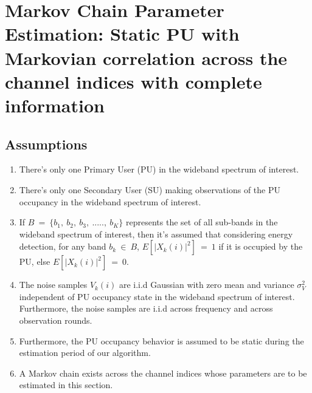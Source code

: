 \documentclass[12pt, draftcls, onecolumn]{IEEEtran}
\begin{document}
\section{Markov Chain Parameter Estimation: Static PU with Markovian correlation across the channel indices with complete information}
\subsection{Assumptions}
\begin{enumerate}
    \item There's only one Primary User (PU) in the wideband spectrum of interest.
    \item There's only one Secondary User (SU) making observations of the PU occupancy in the wideband spectrum of interest.
    \item If $B\ =\ \{b_1,\ b_2,\ b_3,\ .....,\ b_K\}$ represents the set of all sub-bands in the wideband spectrum of interest, then it's assumed that considering energy detection, for any band $b_k\ \in\ B$, $E[|X_k(i)|^2]\ =\ 1$ if it is occupied by the PU, else $E[|X_k(i)|^2]\ =\ 0$.
    \item The noise samples $V_k(i)$ are i.i.d Gaussian with zero mean and variance $\sigma_V^2$ independent of PU occupancy state in the wideband spectrum of interest. Furthermore, the noise samples are i.i.d across frequency and across observation rounds.
    \item Furthermore, the PU occupancy behavior is assumed to be static during the estimation period of our algorithm.
    \item A Markov chain exists across the channel indices whose parameters are to be estimated in this section.
\end{enumerate}
\end{document}
